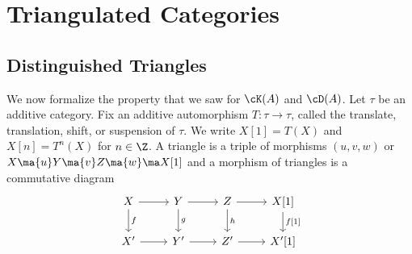 
\newpage
\section{Triangulated Categories}

\subsection{Distinguished Triangles}

We now formalize the property that we saw for $\cK(A)$ and $\cD(A)$. Let $\tau$ be an additive category. Fix an additive automorphism $T: \tau \to \tau$, called the translate, translation, shift, or suspension of $\tau$. We write $X[1]=T(X)$ and $X[n]=T^n(X)$ for $n \in \Z$. A triangle is a triple of morphisms $(u,v,w)$ or $X \ma{u} Y \ma{v} Z \ma{w} \ma X[1]$ and a morphism of triangles is a commutative diagram
\[
\begin{tikzcd}
X \arrow{r} \arrow{d}{f} & Y \arrow{r} \arrow{d}{g} & Z \arrow{r} \arrow{d}{h} & X[1] \arrow{d}{f[1]} \\
X' \arrow{r} & Y' \arrow{r} & Z' \arrow{r} & X'[1]
\end{tikzcd}
\]
